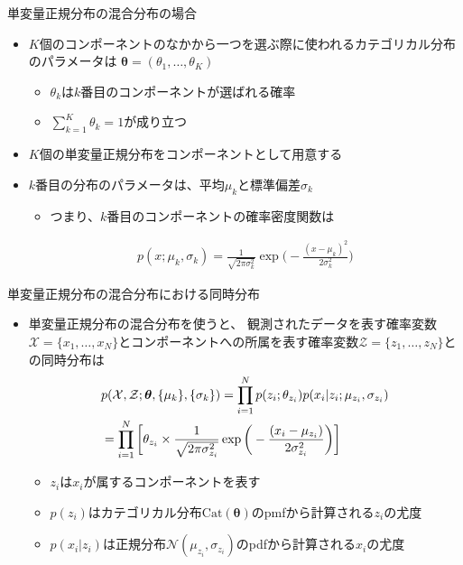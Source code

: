 \documentclass[aspectratio=169,unicode,dvipdfmx,14pt]{beamer}
\begin{document}
\begin{frame}{単変量正規分布の混合分布の場合}
\begin{itemize}
\item $K$個のコンポーネントのなかから一つを選ぶ際に使われるカテゴリカル分布のパラメータは
$\bm{\theta} = (\theta_1,\ldots,\theta_K)$
\begin{itemize}
\item $\theta_k$は$k$番目のコンポーネントが選ばれる確率
\item $\sum_{k=1}^K \theta_k = 1$が成り立つ
\end{itemize}
\item $K$個の単変量正規分布をコンポーネントとして用意する
\item $k$番目の分布のパラメータは、平均$\mu_k$と標準偏差$\sigma_k$
\begin{itemize}
\item つまり、$k$番目のコンポーネントの確率密度関数は
\end{itemize}
\begin{align}
p(x;\mu_k,\sigma_k) = \frac{1}{\sqrt{2\pi\sigma_k^2}}\exp\Big( - \frac{(x - \mu_k)^2}{2\sigma_k^2} \Big)
\end{align}
\end{itemize}
\end{frame}

\begin{frame}{単変量正規分布の混合分布における同時分布}
\vspace{-.1in}
\begin{itemize}
\item 単変量正規分布の混合分布を使うと、
観測されたデータを表す確率変数$\mathcal{X} = \{x_1, \ldots, x_N\}$とコンポーネントへの所属を表す確率変数$\mathcal{Z} = \{z_1,\ldots,z_N\}$との同時分布は
\vspace{-.1in}
\begin{align}
& p( \mathcal{X}, \mathcal{Z} ;\bm{\theta}, \{ \mu_k \}, \{ \sigma_k \})
= \prod_{i=1}^N p(z_i ; \theta_{z_i}) p(x_i | z_i ; \mu_{z_i}, \sigma_{z_i})
\notag \\ &
= \prod_{i=1}^N \bigg[ \theta_{z_i} \times \frac{1}{\sqrt{2\pi\sigma_{z_i}^2}}\exp\bigg( - \frac{(x_i - \mu_{z_i})}{2\sigma_{z_i}^2} \bigg) \bigg]
\label{eq:joint_MN}
\end{align}
\vspace{-.15in}
\begin{itemize}
\item $z_i$は$x_i$が属するコンポーネントを表す
\item $p(z_i)$はカテゴリカル分布$\mbox{Cat}(\bm{\theta})$のpmfから計算される$z_i$の尤度
\item $p(x_i | z_i)$は正規分布$\mathcal{N}(\mu_{z_i}, \sigma_{z_i})$のpdfから計算される$x_i$の尤度
\end{itemize}
\end{itemize}
\end{frame}
\end{document}
